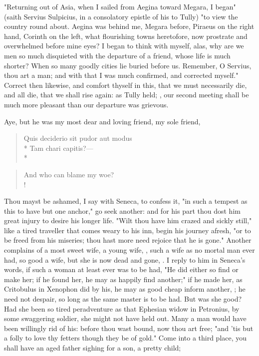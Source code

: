 {"Returning out of Asia, when I sailed from Aegina toward Megara, I began" (saith Servius Sulpicius, in a consolatory epistle of his to Tully) "to view the country round about. Aegina was behind me, Megara before, Piraeus on the right hand, Corinth on the left, what flourishing towns heretofore, now prostrate and overwhelmed before mine eyes? I began to think with myself, alas, why are we men so much disquieted with the departure of a friend, whose life is much shorter? When so many goodly cities lie buried before us. Remember, O Servius, thou art a man; and with that I was much confirmed, and corrected myself." Correct then likewise, and comfort thyself in this, that we must necessarily die, and all die, that we shall rise again: as Tully held; , our second meeting shall be much more pleasant than our departure was grievous.

Aye, but he was my most dear and loving friend, my sole friend,

\begin{latin}%
\begin{verse}%
Quis deciderio sit pudor aut modus\\*
Tam chari capitis?---\\*
\end{verse}%
\end{latin}%

\begin{verse}%
And who can blame my woe?\\!
\end{verse}%

Thou mayst be ashamed, I say with Seneca, to confess it, "in such a tempest as this to have but one anchor," go seek another: and for his part thou dost him great injury to desire his longer life. "Wilt thou have him crazed and sickly still," like a tired traveller that comes weary to his inn, begin his journey afresh, "or to be freed from his miseries; thou hast more need rejoice that he is gone." Another complains of a most sweet wife, a young wife, , such a wife as no mortal man ever had, so good a wife, but she is now dead and gone, . I reply to him in Seneca's words, if such a woman at least ever was to be had, "He did either so find or make her; if he found her, he may as happily find another;" if he made her, as Critobulus in Xenophon did by his, he may as good cheap inform another, ; he need not despair, so long as the same master is to be had. But was she good? Had she been so tired peradventure as that Ephesian widow in Petronius, by some swaggering soldier, she might not have held out. Many a man would have been willingly rid of his: before thou wast bound, now thou art free; "and 'tis but a folly to love thy fetters though they be of gold." Come into a third place, you shall have an aged father sighing for a son, a pretty child;

}

